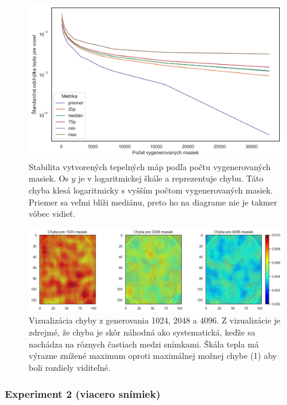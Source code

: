 \begin{figure}[h!]
    \centering
    \includegraphics[width=14cm]{assets/images/risei_stability_1.png}
    \caption{Stabilita vytvorených tepelných máp podľa počtu vygenerovaných masiek. Os $y$ je v logaritmickej škále a reprezentuje chybu. Táto chyba klesá logaritmicky s vyšším počtom vygenerovaných masiek. Priemer sa veľmi blíži mediánu, preto ho na diagrame nie je takmer vôbec vidieť.}
    \label{fig:risei_stability_1}
\end{figure}

\begin{figure}[h!]
    \centering
    \includegraphics[width=14cm]{assets/images/risei_stability_error_visialisation.png}
    \caption{Vizualizácia chyby z generovania 1024, 2048 a 4096. Z vizualizácie je zdrejmé, že chyba je skôr náhodná ako systematická, keďže sa nachádza na rôznych častiach medzi snímkami. Škála tepla má výrazne znížené maximum oproti maximálnej možnej chybe (1) aby boli rozdiely viditeľné.}
    \label{fig:risei_stability_error_visialisation}
\end{figure}

\subsubsection{Experiment 2 (viacero snímiek)}

